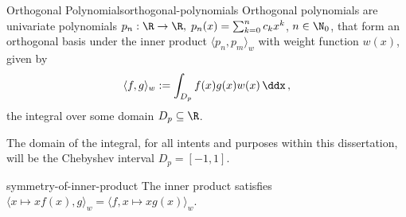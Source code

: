 \begin{definition}{Orthogonal Polynomials}{orthogonal-polynomials}
  Orthogonal polynomials are univariate polynomials
  $p_n: \R \to \R, \; p_n(x) = \sum_{k=0}^{n} c_k x^k$, $n \in \N_0$,
  that form an orthogonal basis under the inner product $\langle p_n, p_m \rangle_w$ with weight function $w(x)$, given by
  $$\langle f, g \rangle_w := \int_{D_p} f(x) g(x) w(x) \,\ddx\,,$$
  the integral over some domain $D_p \subseteq \R$.
\end{definition}

The domain of the integral, for all intents and purposes within this dissertation, will be the Chebyshev interval $D_p = [-1, 1]$.

\begin{remark}{}{symmetry-of-inner-product}
  The inner product satisfies $\langle x\mapsto xf(x), g \rangle_w = \langle f, x \mapsto xg(x)\rangle_w$.
\end{remark}
